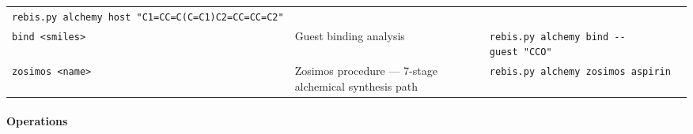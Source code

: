 \documentclass[12pt,a4paper]{article}
\begin{document}
\begin{longtable}[]{@{}lll@{}}
\begin{minipage}[t]{0.24\columnwidth}
\texttt{rebis.py\ alchemy\ host\ "C1=CC=C(C=C1)C2=CC=CC=C2"}\strut
\end{minipage}\tabularnewline
\begin{minipage}[t]{0.32\columnwidth}\raggedright
\texttt{bind\ \textless{}smiles\textgreater{}}\strut
\end{minipage} & \begin{minipage}[t]{0.35\columnwidth}\raggedright
Guest binding analysis\strut
\end{minipage} & \begin{minipage}[t]{0.24\columnwidth}\raggedright
\texttt{rebis.py\ alchemy\ bind\ -\/-guest\ "CCO"}\strut
\end{minipage}\tabularnewline
\begin{minipage}[t]{0.32\columnwidth}\raggedright
\texttt{zosimos\ \textless{}name\textgreater{}}\strut
\end{minipage} & \begin{minipage}[t]{0.35\columnwidth}\raggedright
Zosimos procedure --- 7-stage alchemical synthesis path\strut
\end{minipage} & \begin{minipage}[t]{0.24\columnwidth}\raggedright
\texttt{rebis.py\ alchemy\ zosimos\ aspirin}\strut
\end{minipage}\tabularnewline
\bottomrule
\end{longtable}

\hypertarget{operations}{%
\paragraph{Operations}\label{operations}}
\end{document}
